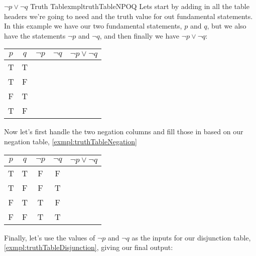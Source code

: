 \begin{exmpl}[label={exmpl:truthTableNPOQ}]{$\lnot p \lor \lnot q$ Truth Table}{xmpltruthTableNPOQ}
    Lets start by adding in all the table headers we're going to need and the truth value for out fundamental statements. In this example we have our two fundamental statements, $p$ and $q$, but we also have the statements $\lnot p$ and $\lnot q$, and then finally we have $\lnot p \lor \lnot q$:

    \begin{center}
        \begin{tabular}{|c|c|c|c|c|}
            \hline
            $p$ & $q$ & $\lnot p$ & $\lnot q$ & $\lnot p \lor \lnot q$ \\
            \hline
            T   & T   &           &           &                        \\
            \hline
            T   & F   &           &           &                        \\
            \hline
            F   & T   &           &           &                        \\
            \hline
            T   & F   &           &           &                        \\
            \hline
        \end{tabular}
    \end{center}

    Now let's first handle the two negation columns and fill those in based on our negation table, \cref{exmpl:truthTableNegation}
    \begin{center}
        \begin{tabular}{|c|c|c|c|c|}
            \hline
            $p$ & $q$ & $\lnot p$ & $\lnot q$ & $\lnot p \lor \lnot q$ \\
            \hline
            T   & T   & F         & F         &                        \\
            \hline
            T   & F   & F         & T         &                        \\
            \hline
            F   & T   & T         & F         &                        \\
            \hline
            F   & F   & T         & T         &                        \\
            \hline
        \end{tabular}
    \end{center}

    Finally, let's use the values of $\lnot p$ and $\lnot q$ as the inputs for our disjunction table, \cref{exmpl:truthTableDisjunction}, giving our final output:


\end{exmpl}

